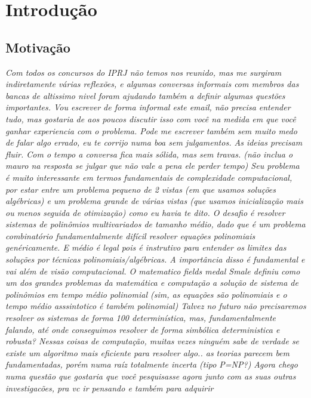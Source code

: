 \section{Introdução}

\subsection{Motivação}

\textit{ Com todos os concursos do IPRJ não temos nos reunido, mas me surgiram
indiretamente várias reflexões, e algumas conversas informais com membros
das bancas de altissimo nivel foram ajudando também a definir algumas
questões importantes. Vou escrever de forma informal este email, não
precisa entender tudo, mas gostaria de aos poucos discutir isso com você na
medida em que você ganhar experiencia com o problema. Pode me escrever
também sem muito medo de falar algo errado, eu te corrijo numa boa sem
julgamentos. As ideias precisam fluir. Com o tempo a conversa fica mais
sólida, mas sem travas. (não inclua o mauro na resposta se julgar que não
vale a pena ele perder tempo)
Seu problema é muito interessante em termos fundamentais de complexidade
computacional, por estar entre um problema pequeno de 2 vistas (em que
usamos soluções algébricas) e um problema grande de várias vistas (que
usamos inicialização mais ou menos seguida de otimização) como eu havia te
dito. O desafio é resolver sistemas de polinômios multivariados de tamanho
médio, dado que é um problema combinatório fundamentalmente difícil
resolver equações polinomiais genéricamente. E médio é legal pois é
instrutivo para entender os limites das soluções por técnicas
polinomiais/algébricas. A importância disso é fundamental e vai além de
visão computacional.
O matematico fields medal Smale definiu como um dos grandes problemas da
matemática e computação a solução de sistema de polinômios em tempo médio
polinomial (sim, as equações são polinomiais e o tempo médio asssintotico é
também polinomial)
Talvez no futuro não precisaremos resolver os sistemas de forma 100%
determinística, mas, fundamentalmente falando, até onde conseguimos
resolver de forma simbólica deterministica e robusta? Nessas coisas de
computação, muitas vezes ninguém sabe de verdade se existe um algoritmo
mais eficiente para resolver algo.. as teorias parecem bem fundamentadas,
porém numa raíz totalmente incerta (tipo P=NP?)
Agora chego numa questão que gostaria que você pesquisasse agora junto com
as suas outras investigacões, pra vc ir pensando e também para adquirir
}

